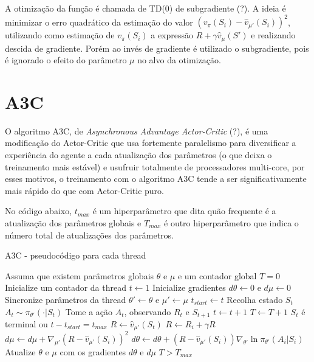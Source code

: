 A otimização da função  é chamada de TD(0) de subgradiente (?). A ideia é minimizar o erro quadrático da estimação do valor $(v_\pi(S_i) - \hat{v}_{\mu'}(S_i))^2$, utilizando como estimação de $v_\pi(S_i)$ a expressão $R + \gamma \hat{v}_{\mu}(S')$ e realizando descida de gradiente. Porém ao invés de gradiente é utilizado o subgradiente, pois é ignorado o efeito do parâmetro $\mu$ no alvo da otimização.

\section{A3C}

O algoritmo A3C, de \textit{Asynchronous Advantage Actor-Critic} (?), é uma modificação do Actor-Critic que usa fortemente paralelismo para diversificar a experiência do agente a cada atualização dos parâmetros (o que deixa o treinamento mais estável) e usufruir totalmente de processadores multi-core, por esses motivos, o treinamento com o algoritmo A3C tende a ser significativamente mais rápido do que com Actor-Critic puro.

No código abaixo, $t_{max}$ é um hiperparâmetro que dita quão frequente é a atualização dos parâmetros globais e $T_{max}$ é outro hiperparâmetro que indica o número total de atualizações dos parâmetros.

\begin{algorithm}
\caption{A3C - pseudocódigo para cada thread}\label{ac}
\begin{algorithmic}[1]
\State Assuma que existem parâmetros globais $\theta$ e $\mu$ e um contador global $T = 0$
\State Inicialize um contador da thread $t\gets 1$
\Repeat
    \State Inicialize gradientes $d\theta\gets 0$ e $d\mu\gets 0$
    \State Sincronize parâmetros da thread $\theta'\gets \theta$ e $\mu'\gets \mu$ 
    \State $t_{start}\gets t$
    \State Recolha estado $S_t$
    \Repeat
        \State $A_t \sim \pi_{\theta'}(\cdot|S_t)$
        \State Tome a ação $A_t$, observando $R_t$ e $S_{t+1}$
        \State $t\gets t + 1$
        \State $T\gets T + 1$
    \Until $S_t$ é terminal ou $t - t_{start} = t_{max}$
    \State $R\gets \hat{v}_{\mu'}(S_t)$
        \State $R\gets R_i + \gamma R$
        \State $d\mu\gets d\mu + \nabla_{\mu'}(R - \hat{v}_{\mu'}(S_i))^2$
        \State $d\theta\gets d\theta + (R - \hat{v}_{\mu'}(S_i))\nabla_{\theta'}\ln \pi_{\theta'}(A_i | S_i)$
    \EndFor
    \State Atualize $\theta$ e $\mu$ com os gradientes $d\theta$ e $d\mu$
\Until $T > T_{max}$
\EndProcedure
\end{algorithmic}
\end{algorithm}
